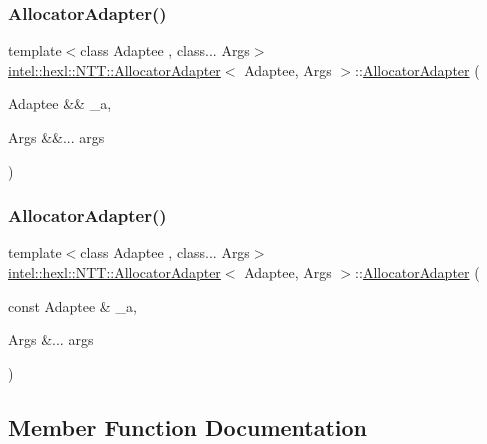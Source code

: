 \subsubsection{\texorpdfstring{Allocator\+Adapter()}{AllocatorAdapter()}\hspace{0.1cm}{\footnotesize\ttfamily [1/2]}}
{\footnotesize\ttfamily template$<$class Adaptee , class... Args$>$ \\
\hyperlink{structintel_1_1hexl_1_1NTT_1_1AllocatorAdapter}{intel\+::hexl\+::\+N\+T\+T\+::\+Allocator\+Adapter}$<$ Adaptee, Args $>$\+::\hyperlink{structintel_1_1hexl_1_1NTT_1_1AllocatorAdapter}{Allocator\+Adapter} (\begin{DoxyParamCaption}\item[{Adaptee \&\&}]{\+\_\+a,  }\item[{Args \&\&...}]{args }\end{DoxyParamCaption})\hspace{0.3cm}{\ttfamily [explicit]}}

\mbox{\label{structintel_1_1hexl_1_1NTT_1_1AllocatorAdapter_aee97fbd36cf2299db87f6dbe75f12396}} 
\subsubsection{\texorpdfstring{Allocator\+Adapter()}{AllocatorAdapter()}\hspace{0.1cm}{\footnotesize\ttfamily [2/2]}}
{\footnotesize\ttfamily template$<$class Adaptee , class... Args$>$ \\
\hyperlink{structintel_1_1hexl_1_1NTT_1_1AllocatorAdapter}{intel\+::hexl\+::\+N\+T\+T\+::\+Allocator\+Adapter}$<$ Adaptee, Args $>$\+::\hyperlink{structintel_1_1hexl_1_1NTT_1_1AllocatorAdapter}{Allocator\+Adapter} (\begin{DoxyParamCaption}\item[{const Adaptee \&}]{\+\_\+a,  }\item[{Args \&...}]{args }\end{DoxyParamCaption})}



\subsection{Member Function Documentation}
\mbox{\label{structintel_1_1hexl_1_1NTT_1_1AllocatorAdapter_a408a6a4b42aef1db5ab7e9b5c8ec2670}} 
